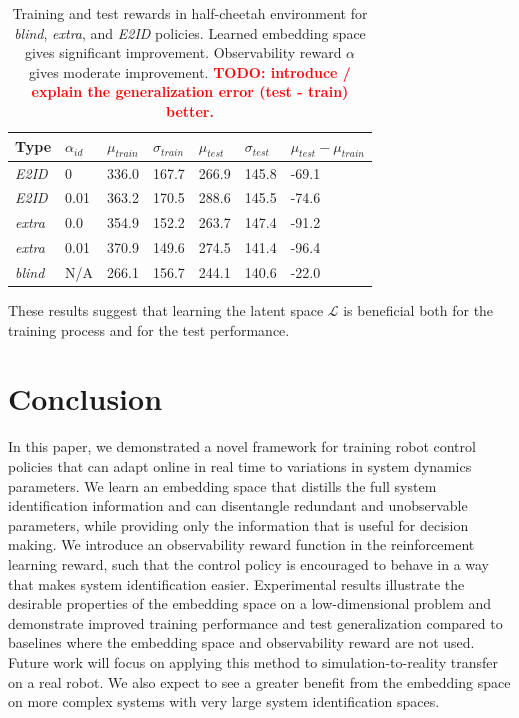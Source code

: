 \documentclass{article}
\newcommand{\TODO}[1]{\textcolor{red}{\textbf{TODO: #1}}}
\newcommand{\cL}{\mathcal{L}}
\newcommand{\blind}{\emph{blind}}
\newcommand{\extra}{\emph{extra}}
\newcommand{\embed}{\emph{E2ID}}
\newcommand{\latent}{\cL}
\begin{document}
\begin{table}[ht]
\centering
\begin{tabular}{l l l l l l l}
Type & $\alpha_{id}$ & $\mu_{train}$ & $\sigma_{train}$& $\mu_{test}$ & $\sigma_{test}$ & $\mu_{test} - \mu_{train}$ \\
\hline
\embed{} & 0 & 336.0 & 167.7 & 266.9 & 145.8 & -69.1 \\
\embed{} & 0.01 & 363.2 & 170.5 & 288.6 & 145.5 & -74.6 \\
\extra{} & 0.0 & 354.9 & 152.2  & 263.7 & 147.4 & -91.2 \\
\extra{} & 0.01 & 370.9 & 149.6 & 274.5 & 141.4 & -96.4 \\
\blind{} & N/A & 266.1 & 156.7 & 244.1 & 140.6 & -22.0
\end{tabular}

\vspace{0.4cm}

\caption{
Training and test rewards in half-cheetah environment for \blind{}, \extra{}, and \embed{} policies.
Learned embedding space gives significant improvement.
Observability reward $\alpha$ gives moderate improvement.
\TODO{introduce / explain the generalization error (test - train) better.}
}
\label{cheetah}
\end{table}

These results suggest that learning the latent space $\latent$ is beneficial
both for the training process and for the test performance.

\section{Conclusion}
In this paper, we demonstrated a novel framework for training robot control policies
that can adapt online in real time to variations in system dynamics parameters.
We learn an embedding space that distills the full system identification information
and can disentangle redundant and unobservable parameters, while providing only the information that is useful for decision making.
We introduce an observability reward function in the reinforcement learning reward,
such that the control policy is encouraged to behave in a way that makes system identification easier.
Experimental results illustrate the desirable properties of the embedding space on a low-dimensional problem
and demonstrate improved training performance and test generalization compared to baselines
where the embedding space and observability reward are not used.
Future work will focus on applying this method to simulation-to-reality transfer on a real robot.
We also expect to see a greater benefit from the embedding space on more complex systems with very large system identification spaces.

\clearpage
\acknowledgments{}
{}
\end{document}
